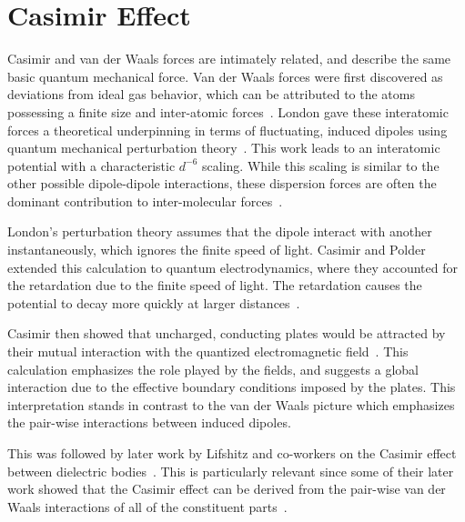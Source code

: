 
\section{Casimir Effect}
\label{sec:casimir}
Casimir and van der Waals forces are intimately related, and describe the same basic quantum mechanical force. 
Van der Waals forces were first discovered as deviations from ideal gas behavior, which can be attributed 
to the atoms possessing a finite size and inter-atomic forces~\cite{vanderWaals,Parsegian2006}.
London gave these interatomic forces a theoretical underpinning in terms of fluctuating,
 induced dipoles using quantum mechanical perturbation theory~\cite{London1930}.
  This work leads to an interatomic potential with a characteristic $d^{-6}$ scaling.
While this scaling is similar to the other possible dipole-dipole interactions, 
these dispersion forces are often the dominant contribution to inter-molecular forces~\cite{Israelachvili2011}.

London's perturbation theory assumes that the dipole interact with another instantaneously, which
ignores the finite speed of light.  Casimir and Polder extended this calculation to quantum electrodynamics,
where they accounted for the retardation due to the finite speed of light. 
The retardation causes the potential to decay more quickly at larger distances~\cite{CasimirPolder1948}.  

Casimir then showed that uncharged, conducting plates would be attracted by their mutual
interaction with the quantized electromagnetic field~\cite{Casimir1948}.
This calculation emphasizes the role played by the fields, and suggests
a global interaction due to the effective boundary conditions imposed by the plates.
This interpretation stands in contrast to the van der Waals picture which emphasizes the pair-wise interactions between induced dipoles.

This was followed by later work by Lifshitz and co-workers on the Casimir effect between dielectric bodies~\cite{Lifshitz1956}.
This is particularly relevant since some of their later work showed that the Casimir effect can be derived 
from the pair-wise van der Waals interactions of all of the constituent parts~\cite{Dzyaloshinskii1961}.  

